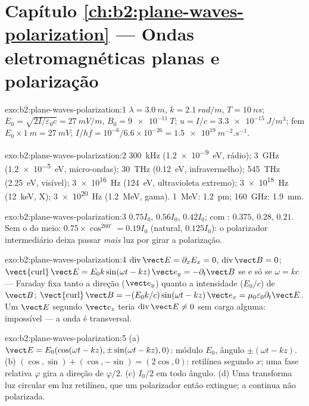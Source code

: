 \section*{Capítulo \ref{ch:b2:plane-waves-polarization} --- Ondas eletromagnéticas planas e polarização}

\begin{solution}{exo:b2:plane-waves-polarization:1}
$\lambda = \qty{3.0}{m}$, $k = \qty{2.1}{rad/m}$, $T = \qty{10}{ns}$; $E_0 = \sqrt{2I/\varepsilon_0c}
= \qty{27}{mV/m}$, $B_0 = \qty{9e-11}{T}$; $u = I/c = \qty{3.3e-15}{J/m^3}$; fem
$E_0 \times \qty{1}{m} = \qty{27}{mV}$; $I/hf = 10^{-6}/6.6 \times 10^{-26} = \qty{1.5e19}{m^{-2}.s^{-1}}$.
\end{solution}

\begin{solution}{exo:b2:plane-waves-polarization:2}
\qty{300}{kHz} (\qty{1.2e-9}{eV}, rádio); \qty{3}{GHz} (\qty{1.2e-5}{eV}, micro-ondas);
\qty{30}{THz} (\qty{0.12}{eV}, infravermelho); \qty{545}{THz} (\qty{2.25}{eV}, visível);
\qty{3e16}{Hz} (\qty{124}{eV}, ultravioleta extremo); \qty{3e18}{Hz} (\qty{12}{keV}, X);
\qty{3e20}{Hz} (\qty{1.2}{MeV}, gama). \qty{1}{MeV}: \qty{1.2}{pm}; \qty{160}{GHz}: \qty{1.9}{mm}.
\end{solution}

\begin{solution}{exo:b2:plane-waves-polarization:3}
$0.75I_0$, $0.56I_0$, $0.42I_0$; com : $0.375$, $0.28$, $0.21$. Sem o
do meio: $0.75 \times \cos^260^\circ = 0.19I_0$ (natural, $0.125I_0$): o
polarizador intermediário deixa passar \emph{mais} luz por girar a
polarização.
\end{solution}

\begin{solution}{exo:b2:plane-waves-polarization:4}
$\operatorname{div}\vect E = \partial_xE_x = 0$, $\operatorname{div}\vect B = 0$;
$\operatorname{\vect{curl}}\vect E = E_0k\sin(\omega t - kz)\,\vect e_y = -\partial_t\vect B$ se e só se $\omega =
kc$ --- Faraday fixa tanto a direção ($\vect e_y$) quanto a intensidade
($E_0/c$) de $\vect B$; $\operatorname{\vect{curl}}\vect B = -(E_0k/c)\sin(\omega t - kz)\,\vect e_x
= \mu_0\varepsilon_0\partial_t\vect E$. Um $\vect E$ segundo $\vect e_z$ teria $\operatorname{div}
\vect E \ne 0$ sem carga alguma: impossível --- a onda é transversal.
\end{solution}

\begin{solution}{exo:b2:plane-waves-polarization:5}
(a) $\vect E = E_0(\cos(\omega t - kz), \pm\sin(\omega t - kz), 0)$: módulo $E_0$,
ângulo $\pm(\omega t - kz)$. (b) $(\cos, \sin) + (\cos, -\sin) = (2\cos, 0)$: retilínea
segundo $x$; uma fase relativa $\varphi$ gira a direção de $\varphi/2$. (c)
$I_0/2$ em todo ângulo. (d) Uma  transforma luz circular
em luz retilínea, que um polarizador então extingue; a 
continua não polarizada.
\end{solution}

